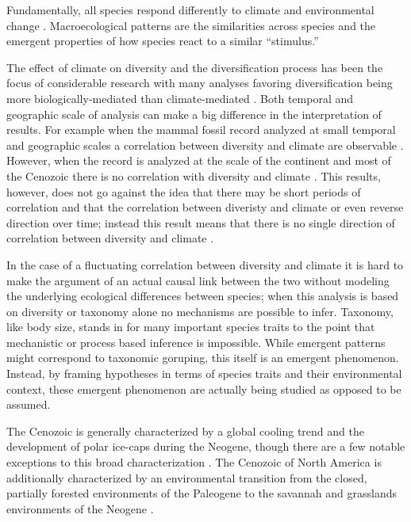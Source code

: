 \documentclass[12pt,letterpaper]{article}
\begin{document}




Fundamentally, all species respond differently to climate and environmental change \citep{Blois2009}. Macroecological patterns are the similarities across species and the emergent properties of how species react to a similar ``stimulus.''

The effect of climate on diversity and the diversification process has been the focus of considerable research with many analyses favoring diversification being more biologically-mediated than climate-mediated \citep{Alroy1996a,Alroy2000g,Figueirido2012,Clyde1998a}. Both temporal and geographic scale of analysis can make a big difference in the interpretation of results. For example when the mammal fossil record analyzed at small temporal and geographic scales a correlation between diversity and climate are observable \citep{Clyde1998a}. However, when the record is analyzed at the scale of the continent and most of the Cenozoic there is no correlation with diversity and climate \citep{Alroy2000g}. This results, however, does not go against the idea that there may be short periods of correlation and that the correlation between diveristy and climate or even reverse direction over time; instead this result means that there is no single direction of correlation between diversity and climate \citep{Figueirido2012}. 

In the case of a fluctuating correlation between diversity and climate it is hard to make the argument of an actual causal link between the two without modeling the underlying ecological differences between species; when this analysis is based on diversity or taxonomy alone no mechanisms are possible to infer. Taxonomy, like body size, stands in for many important species traits to the point that mechanistic or process based inference is impossible. While emergent patterns might correspond to taxonomic goruping, this itself is an emergent phenomenon. Instead, by framing hypotheses in terms of species traits and their environmental context, these emergent phenomenon are actually being studied as opposed to be assumed. 

The Cenozoic is generally characterized by a global cooling trend and the development of polar ice-caps during the Neogene, though there are a few notable exceptions to this broad characterization \citep{Zachos2001,Zachos2008,Cramer2011}. The Cenozoic of North America is additionally characterized by an environmental transition from the closed, partially forested environments of the Paleogene to the savannah and grasslands environments of the Neogene \citep{Blois2009,Janis1993b,Janis2000,Stromberg2005}.
\end{document}
